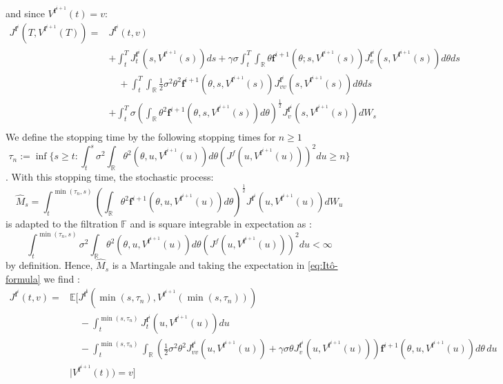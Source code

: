 \documentclass[oneside, a4paper, onecolumn, 11pt]{article}
\begin{document}
and since $V^{\boldsymbol{f}^{i+1}}(t) = v$: 
\begin{equation}  
\begin{aligned}
J^{\boldsymbol{f}^i}(T,V^{\boldsymbol{f}^{i+1}}(T)) = &J^{\boldsymbol{f}^i}(t,v)\\
& + \int_{t}^{T} J^{\boldsymbol{f}^i}_t(s, V^{\boldsymbol{f}^{i+1}}(s)) ds
+  \gamma \sigma \int_{t}^{T} \int_{\mathbb{R}} \theta \boldsymbol{f}^{i+1}(\theta;s,V^{\boldsymbol{f}^{i+1}}(s)) J^{\boldsymbol{f}^i}_{v}(s, V^{\boldsymbol{f}^{i+1}}(s)) d\theta  ds \\
&\quad + \int_{t}^{T}\int_{\mathbb{R}}\frac{1}{2} \sigma^2 \theta^2 \boldsymbol{f}^{i+1}(\theta,s,V^{\boldsymbol{f}^{i+1}}(s)) J^{\boldsymbol{f}^i}_{vv}(s, V^{\boldsymbol{f}^{i+1}}(s))d\theta ds \\
&+ \int_{t}^{T} \sigma \left(\int_{\mathbb{R}}\theta^2 \boldsymbol{f}^{i+1}(\theta, s, V^{\boldsymbol{f}^{i+1}}(s))d\theta \right)^\frac{1}{2} J_v^{\boldsymbol{f}^i}(s, V^{\boldsymbol{f}^{i+1}}(s)) dW_s\\    
\end{aligned} 
\label{eq:Itô-formula}
\end{equation}
We define the stopping time by the following stopping times  for $ n \geq 1$\\ 
$$\tau_n := \inf\{s\geq t : \int_{t}^{s}\sigma^2\int_{\mathbb{R}} \theta^2 (\theta,u,V^{\boldsymbol{f}^{i+1}}(u))d\theta (J^f(u,V^{\boldsymbol{f}^{i+1}}(u)))^2 du \geq n \}$$. With this stopping time, the stochastic process: 
$$\hat{M}_s= \int_{t}^{\min(\tau_n,s)}\left(\int_{\mathbb{R}}\theta^2 \boldsymbol{f}^{i+1}(\theta, u, V^{\boldsymbol{f}^{i+1}}(u))d\theta \right)^\frac{1}{2} J^{\boldsymbol{f}^i}(u, V^{\boldsymbol{f}^{i+1}}(u)) dW_u$$ is adapted to the filtration $\mathbb{F}$ and is square integrable in expectation as :
$$
\int_{t}^{\min(\tau_n,s)}\sigma^2\int_{\mathbb{R}} \theta^2 (\theta,u,V^{\boldsymbol{f}^{i+1}}(u))d\theta (J^f(u,V^{\boldsymbol{f}^{i+1}}(u)))^2 du < \infty
$$
by definition. Hence, $\hat{M}_s$ is a Martingale and taking the expectation in \eqref{eq:Itô-formula} we find : 
\begin{equation}   
\begin{aligned}  
    J^{\boldsymbol{f}^i}(t,v) =  &\mathbb{E} \Bigg[ 
    J^{\boldsymbol{f^i}}\left(\min(s,\tau_n), V^{\boldsymbol{f}^{i+1}}(\min(s,\tau_n))\right) \\
    &\quad -\int_{t}^{\min(s,\tau_n)} J_t^{\boldsymbol{f}^i} \left(u,V^{\boldsymbol{f}^{i+1}}(u)\right) du \\
    &\quad - \int_{t}^{\min(s,\tau_n)} \int_{\mathbb{R}} \left(\frac{1}{2} \sigma^2 \theta^2 J^{\boldsymbol{f}^i}_{vv}(u, V^{\boldsymbol{f}^{i+1}}(u)) + \gamma\sigma\theta J^{\boldsymbol{f}^i}_v(u, V^{\boldsymbol{f}^{i+1}}(u)) \right) \boldsymbol{f}^{i+1}(\theta, u, V^{\boldsymbol{f}^{i+1}}(u)) d\theta \, du \\
     & \mid  V^{\boldsymbol{f}^{i+1}}(t)) = v\Bigg]  
\end{aligned} \label{eq:stopping_time_exp}
\end{equation}
\end{document}

